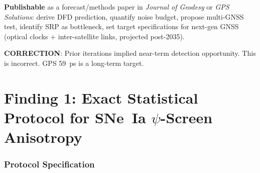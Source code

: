 \documentclass[11pt,a4paper]{article}
\begin{document}
\begin{tcolorbox}[colback=yellow!5!white, colframe=red!70!black,
  title=\textbf{W4i16 TOP 5 FINDINGS --- RANKED BY IMPACT}]
\begin{enumerate}
  \textbf{Publishable} as a forecast/methods paper in \emph{Journal
  of Geodesy} or \emph{GPS Solutions}: derive DFD prediction, quantify
  noise budget, propose multi-GNSS test, identify SRP as bottleneck,
  set target specifications for next-gen GNSS (optical clocks +
  inter-satellite links, projected post-2035).

  \textbf{CORRECTION}: Prior iterations implied near-term detection
  opportunity.  This is incorrect.  GPS 59~ps is a long-term target.

\end{enumerate}

\end{tcolorbox}


\part{Finding 1: Exact Statistical Protocol for SNe~Ia $\psi$-Screen
  Anisotropy}
\label{sec:sne-protocol}


\section{Protocol Specification}
\end{document}
